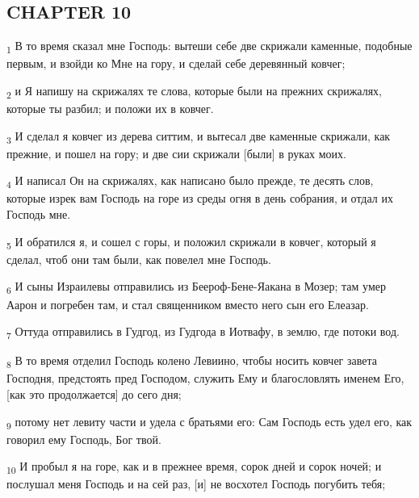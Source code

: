 \subsection{CHAPTER 10}
\begin{tcolorbox}
\textsubscript{1} В то время сказал мне Господь: вытеши себе две скрижали каменные, подобные первым, и взойди ко Мне на гору, и сделай себе деревянный ковчег;
\end{tcolorbox}
\begin{tcolorbox}
\textsubscript{2} и Я напишу на скрижалях те слова, которые были на прежних скрижалях, которые ты разбил; и положи их в ковчег.
\end{tcolorbox}
\begin{tcolorbox}
\textsubscript{3} И сделал я ковчег из дерева ситтим, и вытесал две каменные скрижали, как прежние, и пошел на гору; и две сии скрижали [были] в руках моих.
\end{tcolorbox}
\begin{tcolorbox}
\textsubscript{4} И написал Он на скрижалях, как написано было прежде, те десять слов, которые изрек вам Господь на горе из среды огня в день собрания, и отдал их Господь мне.
\end{tcolorbox}
\begin{tcolorbox}
\textsubscript{5} И обратился я, и сошел с горы, и положил скрижали в ковчег, который я сделал, чтоб они там были, как повелел мне Господь.
\end{tcolorbox}
\begin{tcolorbox}
\textsubscript{6} И сыны Израилевы отправились из Беероф-Бене-Яакана в Мозер; там умер Аарон и погребен там, и стал священником вместо него сын его Елеазар.
\end{tcolorbox}
\begin{tcolorbox}
\textsubscript{7} Оттуда отправились в Гудгод, из Гудгода в Иотвафу, в землю, где потоки вод.
\end{tcolorbox}
\begin{tcolorbox}
\textsubscript{8} В то время отделил Господь колено Левиино, чтобы носить ковчег завета Господня, предстоять пред Господом, служить Ему и благословлять именем Его, [как это продолжается] до сего дня;
\end{tcolorbox}
\begin{tcolorbox}
\textsubscript{9} потому нет левиту части и удела с братьями его: Сам Господь есть удел его, как говорил ему Господь, Бог твой.
\end{tcolorbox}
\begin{tcolorbox}
\textsubscript{10} И пробыл я на горе, как и в прежнее время, сорок дней и сорок ночей; и послушал меня Господь и на сей раз, [и] не восхотел Господь погубить тебя;
\end{tcolorbox}
